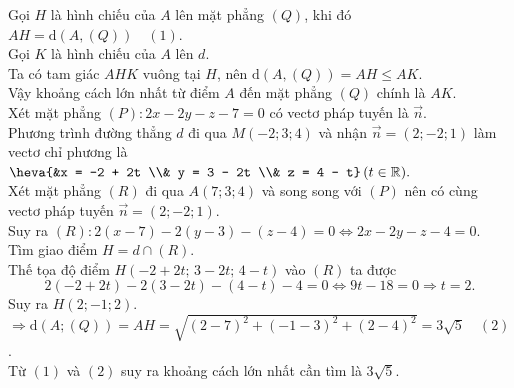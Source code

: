 \begin{ex}
{\begin{itemchoice}
			Gọi $H$ là hình chiếu của $A$ lên mặt phẳng $(Q)$, khi đó $AH = \mathrm{d}(A,(Q))\quad (1)$.\\
			Gọi $K$ là hình chiếu của $A$ lên $d$.\\ Ta có tam giác $AHK$ vuông tại $H$, nên $\mathrm{d}(A,(Q))=AH \le AK$.\\
			Vậy khoảng cách lớn nhất từ điểm $A$ đến mặt phẳng $(Q)$ chính là $AK$.\\ 
			Xét mặt phẳng $(P)\colon 2x - 2y - z - 7 = 0$ có vectơ pháp tuyến là $\overrightarrow{n}$.\\
			Phương trình đường thẳng 
			$d$ đi qua $M(-2;3;4)$ và nhận $\overrightarrow{n}=(2;-2;1)$ làm vectơ chỉ phương là
			$\heva{&x = -2 + 2t \\&
				y = 3 - 2t \\&
				z = 4 - t}\,(t \in \mathbb{R}).$\\
			Xét mặt phẳng $(R)$ đi qua $A(7;3;4)$ và song song với $(P)$ nên có cùng vectơ pháp tuyến $\overrightarrow{n}=(2;-2;1) $.\\
			Suy ra $(R)\colon 2(x-7) - 2(y-3) - (z-4) = 0 \Leftrightarrow 2x - 2y - z - 4 = 0$.\\
			Tìm giao điểm $H = d \cap (R)$.\\ 
			Thế tọa độ điểm $H(-2+2t;\,3-2t;\,4-t)$ vào $(R)$ ta được $$2(-2+2t) -2(3-2t) - (4-t) - 4 = 0\Leftrightarrow 9t - 18 = 0 \Rightarrow t = 2.$$
			Suy ra $H(2;-1;2)$.\\
			$\Rightarrow \mathrm{d}(A;(Q)) =AH
			= \sqrt{(2-7)^2 + (-1-3)^2 + (2-4)^2} = 3\sqrt{5}\quad (2)$.\\
			Từ $(1)$ và $(2)$ suy ra khoảng cách lớn nhất cần tìm là $3\sqrt{5}$.
		\end{itemchoice}
	}
\end{ex}

